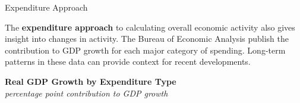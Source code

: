 \documentclass{report}
\begin{document}
\begin{minipage}{0.76\textwidth}   
\normalsize Expenditure Approach
\vspace{-1mm}

\small The \textbf{expenditure approach} to calculating overall economic activity also gives insight into changes in activity. The Bureau of Economic Analysis publish the contribution to GDP growth for each major category of spending. Long-term patterns in these data can provide context for recent developments. 




\vspace{1mm}

\normalsize \textbf{Real GDP Growth by Expenditure Type}\\
\footnotesize{\textit{percentage point contribution to GDP growth}}
\vspace{4.2cm}


\end{minipage}
\end{document}

